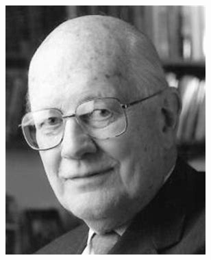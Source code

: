 \documentclass[CJK]{beamer}
\begin{document}
\begin{frame}
\begin{figure}
\includegraphics[scale=0.21]{seitz}
\end{figure}
\ech
\end{frame}
  
\end{document}
